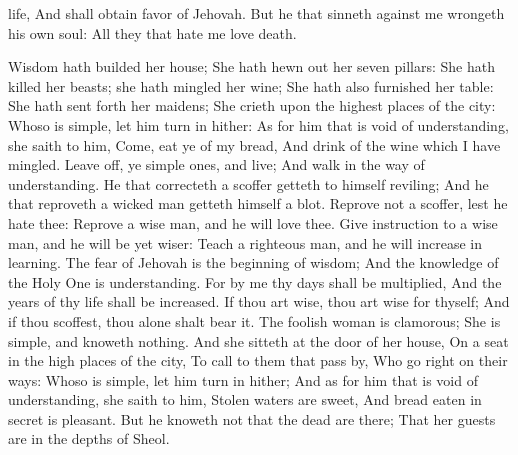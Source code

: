 life, And shall obtain favor of Jehovah.  But he that sinneth against me wrongeth his own soul: All they that hate me love death. 

Wisdom hath builded her house; She hath hewn out her seven pillars:  She hath killed her beasts; she hath mingled her wine; She hath also furnished her table:  She hath sent forth her maidens; She crieth upon the highest places of the city:  Whoso is simple, let him turn in hither: As for him that is void of understanding, she saith to him,  Come, eat ye of my bread, And drink of the wine which I have mingled.  Leave off, ye simple ones, and live; And walk in the way of understanding.  He that correcteth a scoffer getteth to himself reviling; And he that reproveth a wicked man getteth himself a blot.  Reprove not a scoffer, lest he hate thee: Reprove a wise man, and he will love thee.  Give instruction to a wise man, and he will be yet wiser: Teach a righteous man, and he will increase in learning.  The fear of Jehovah is the beginning of wisdom; And the knowledge of the Holy One is understanding.  For by me thy days shall be multiplied, And the years of thy life shall be increased.  If thou art wise, thou art wise for thyself; And if thou scoffest, thou alone shalt bear it.  The foolish woman is clamorous; She is simple, and knoweth nothing.  And she sitteth at the door of her house, On a seat in the high places of the city,  To call to them that pass by, Who go right on their ways:  Whoso is simple, let him turn in hither; And as for him that is void of understanding, she saith to him,  Stolen waters are sweet, And bread eaten in secret is pleasant.  But he knoweth not that the dead are there; That her guests are in the depths of Sheol. 

